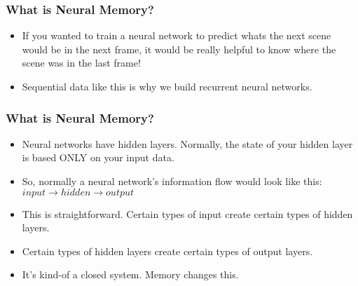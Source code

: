 

\begin{frame}[fragile] \frametitle{What is Neural Memory?}

\begin{itemize}
\item If you wanted to train a neural network to predict whats the next scene would be in the next frame, it would be really helpful to know where the scene was in the last frame! 
\item Sequential data like this is why we build recurrent neural networks.
\end{itemize}
\end{frame}

\begin{frame}[fragile] \frametitle{What is Neural Memory?}

\begin{itemize}
\item Neural networks have hidden layers. Normally, the state of your hidden layer is based ONLY on your input data. 
\item So, normally a neural network's information flow would look like this:
$input \rightarrow hidden  \rightarrow  output$
\item This is straightforward. Certain types of input create certain types of hidden layers. 
\item Certain types of hidden layers create certain types of output layers. 
\item It's kind-of a closed system. Memory changes this. 
\end{itemize}
\end{frame}


